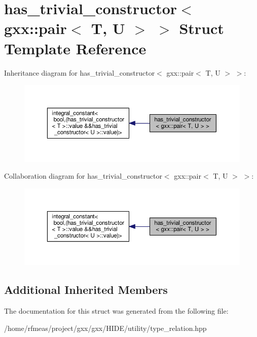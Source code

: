 \hypertarget{structhas__trivial__constructor_3_01gxx_1_1pair_3_01T_00_01U_01_4_01_4}{}\section{has\+\_\+trivial\+\_\+constructor$<$ gxx\+:\+:pair$<$ T, U $>$ $>$ Struct Template Reference}
\label{structhas__trivial__constructor_3_01gxx_1_1pair_3_01T_00_01U_01_4_01_4}


Inheritance diagram for has\+\_\+trivial\+\_\+constructor$<$ gxx\+:\+:pair$<$ T, U $>$ $>$\+:
\nopagebreak
\begin{figure}[H]
\begin{center}
\leavevmode
\includegraphics[width=350pt]{structhas__trivial__constructor_3_01gxx_1_1pair_3_01T_00_01U_01_4_01_4__inherit__graph}
\end{center}
\end{figure}


Collaboration diagram for has\+\_\+trivial\+\_\+constructor$<$ gxx\+:\+:pair$<$ T, U $>$ $>$\+:
\nopagebreak
\begin{figure}[H]
\begin{center}
\leavevmode
\includegraphics[width=350pt]{structhas__trivial__constructor_3_01gxx_1_1pair_3_01T_00_01U_01_4_01_4__coll__graph}
\end{center}
\end{figure}
\subsection*{Additional Inherited Members}


The documentation for this struct was generated from the following file\+:\begin{DoxyCompactItemize}
\item 
/home/rfmeas/project/gxx/gxx/\+H\+I\+D\+E/utility/type\+\_\+relation.\+hpp\end{DoxyCompactItemize}
